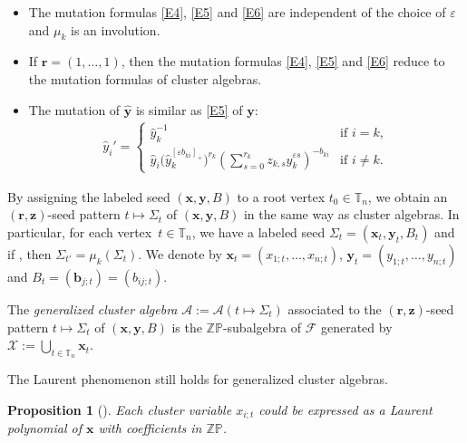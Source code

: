 \documentclass[10pt,a4paper]{amsart}
\newcommand{\Z}{\mathbb{Z}}
\numberwithin{equation}{section}
\newtheorem{Proposition}[Theorem]{Proposition}
 { \theoremstyle{definition}
\newtheorem{Definition}[Theorem]{Definition}
\newtheorem{Note}[Theorem]{Note}
\newtheorem{Example}[Theorem]{Example}
\newtheorem{Remark}[Theorem]{Remark} }
\begin{document}
\begin{Remark}\label{R1}\quad
\begin{itemize}\itemsep=0pt
\item[(1)] The mutation formulas \eqref{E4}, \eqref{E5} and \eqref{E6} are independent of the choice of $\varepsilon$ and $\mu_k$ is an involution.
 \item[(2)] If $\mathbf{r}=(1,\dots,1)$, then the mutation formulas \eqref{E4}, \eqref{E5} and \eqref{E6} reduce to the mutation formulas of cluster algebras.
 \item[(3)] The mutation of $\hat{\mathbf{y}}$ is similar as \eqref{E5} of $\mathbf{y}$:
 \begin{align*}
 \hat{y}_i'=
 \begin{cases}
 \hat{y}_k^{-1} & \text{if $i= k$}, \\
 \displaystyle \hat{y}_i\bigl(\hat{y}_k^{[\varepsilon b_{ki}]_+}\bigr)^{r_k}\left(\sum\limits_{s=0}^{r_k}z_{k,s}\hat{y}_k^{\varepsilon s}\right)^{-b_{ki}}& \text{if $i\neq k$}.
 \end{cases}
 \end{align*}
\end{itemize}
\end{Remark}

By assigning the labeled seed $(\mathbf{x},\mathbf{y}, B)$ to a root vertex $t_0\in \mathbb{T}_n$, we obtain an $(\mathbf{r},\mathbf{z})$-seed pattern $t\mapsto \Sigma_t$ of $(\mathbf{x},\mathbf{y}, B)$ in the same way as cluster algebras. In particular, for each vertex~${t\in \mathbb{T}_n}$, we have a labeled seed $\Sigma_t=(\mathbf{x}_t, \mathbf{y}_t, B_t)$ and if , then $\Sigma_{t'}=\mu_k(\Sigma_t)$. We denote by $\mathbf{x}_t=(x_{1;t},\dots, x_{n;t})$, $\mathbf{y}_t=(y_{1;t},\dots,y_{n;t})$ and $B_t=(\mathbf{b}_{j;t})=(b_{ij;t})$.
\begin{Definition}
 The {\it generalized cluster algebra} $\mathcal{A}:=\mathcal{A}(t\mapsto \Sigma_t)$ associated to the $(\mathbf{r},\mathbf{z})$-seed pattern $t\mapsto \Sigma_t$ of $(\mathbf{x},\mathbf{y}, B)$ is the $\Z \mathbb{P}$-subalgebra of $\mathcal{F}$ generated by
 $\mathcal{X}:=\bigcup_{t\in \mathbb{T}_n}\mathbf{x}_t$.
\end{Definition}
The Laurent phenomenon still holds for generalized cluster algebras.
\begin{Proposition}[{\cite[Theorem 2.5]{Chekhov_Shapiro}}]\label{P6}
 Each cluster variable $x_{i;t}$ could be expressed as a Laurent polynomial of $\mathbf{x}$ with coefficients in $\mathbb{Z}\mathbb{P}$.
\end{Proposition}
\end{document}
